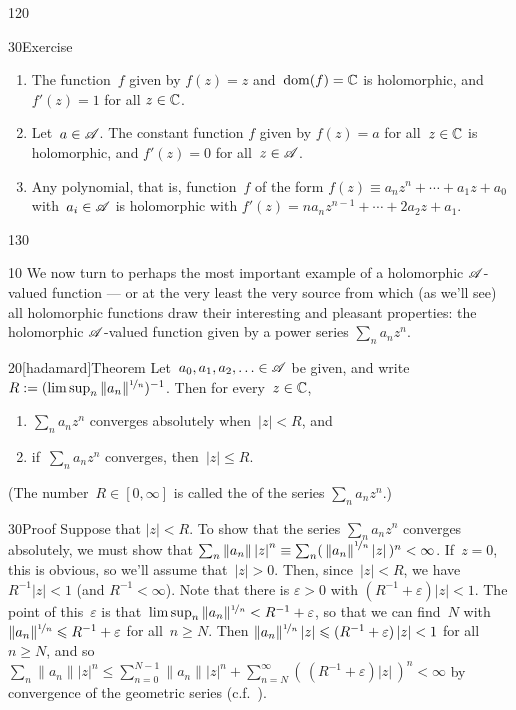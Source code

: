 \begin{parsec}{120}
\begin{point}{30}{Exercise}
\begin{enumerate}
\item
The function~$f$ given by $f(z)=z$ and~$\dom(f)=\C$
is holomorphic, and $f'(z)=1$ for all $z\in\C$.

\item
Let~$a\in \scrA$. The constant function $f$ given by $f(z)=a$
for all~$z\in \C$ is holomorphic, and $f'(z)=0$ for all~$z\in \scrA$.

\item
Any polynomial,
that is, function~$f$ of the form $f(z)\equiv a_n z^n+\dotsb+a_1 z+a_0$
with~$a_i\in \scrA$
is holomorphic with $f'(z)=na_nz^{n-1}+\dotsb+2a_2z+a_1$.
\end{enumerate}%
\spacingfix{}%
\end{point}%
\end{parsec}%
\begin{parsec}{130}%
\begin{point}{10}%
We now turn
to perhaps the most important example
of a holomorphic $\scrA$-valued function ---
or at the very least the very source from
which (as we'll see) all holomorphic functions
draw their interesting and pleasant
properties:
the holomorphic $\scrA$-valued function
given by a power series  $\sum_n a_n z^n$.
\end{point}
\begin{point}{20}[hadamard]{Theorem}%
%
Let~$a_0,a_1,a_2,\dotsc\in\scrA$
be given,
and write~$R:=(\limsup_n \|a_n\|^{\nicefrac{1}{n}})^{-1}$.
Then for every~$z\in\C$,
\begin{enumerate}
\item
$\sum_n a_n z^n$
converges absolutely
when~$\left|z\right| < R$, and 
\item
if~$\sum_n a_n z^n$ converges,
then~$\left|z\right|\leq R$.
\end{enumerate}
(The number~$R\in[0,\infty]$ is called the %
of the series $\sum_n a_n z^n$.)
\begin{point}{30}{Proof}%
Suppose that $\left|z\right|<R$.
To show that the series 
$\sum_n a_nz^n$ converges absolutely,
we must show that $\sum_n \left\|a_n\right\|\left|z\right|^n
\equiv \sum_n (\,\left\|a_n\right\|^{\nicefrac{1}{n}}\left|z\right|\,)^n
<\infty$.
If~$z=0$, this is obvious,
so we'll assume that~$\left|z\right| > 0$.
Then, since~$\left|z\right|<R$,
we have~$R^{-1}\left|z\right|<1$
(and $R^{-1}<\infty$).
Note that
there is $\varepsilon>0$ with $(R^{-1}+\varepsilon)\left|z\right|<1$.
The point of this~$\varepsilon$
is that~$\limsup_n \|a_n\|^{\nicefrac{1}{n}} 
< R^{-1}+\varepsilon$,
so that we can find~$N$ 
with $\|a_n\|^{\nicefrac{1}{n}} \leq R^{-1}+\varepsilon$
for all~$n\geq N$.
Then $\|a_n\|^{\nicefrac{1}{n}}\left|z\right|
\leq (R^{-1}+\varepsilon)\left|z\right|<1$
for all~$n\geq N$,
and so
$\sum_n \|a_n\|\left|z\right|^n 
\leq\sum_{n=0}^{N-1} \|a_n\|\left|z\right|^n+ \sum_{n=N}^\infty 
(\,(R^{-1}+\varepsilon)\left|z\right|\,)^n < \infty$
by  convergence
of the geometric series (c.f.~).


\end{point}
\end{point}
\end{parsec}
